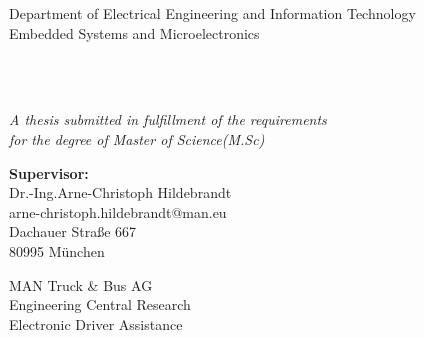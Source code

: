 \begin{titlepage}
\begin{center}
\begin{figure}
\centering
{}
\qquad
{}
\end{figure}

{\Large Department of Electrical Engineering and Information Technology}\\[1.5cm]
{\large Embedded Systems and Microelectronics}\\[0.5cm]

\HRule \\[0.4cm]
{ \huge \ttitle \par}\vspace{0.4cm}
\HRule \\[0.4cm]
\end{center}

\begin{center}
{\textit{A thesis submitted in fulfillment of the requirements\\ for the degree of Master of Science(M.Sc)}}\\[1cm]



\begin{minipage}{0.5\textwidth}
\begin{flushleft}
\textbf{Supervisor:}\\[0.1cm]
Dr.-Ing.Arne-Christoph Hildebrandt\\
arne-christoph.hildebrandt@man.eu\\
Dachauer Straße 667\\
80995 München\\[0.2cm]
\end{flushleft}
\end{minipage}
\begin{minipage}{0.49\textwidth}
\begin{flushright} 
MAN Truck \& Bus AG \\
Engineering Central Research \\
Electronic Driver Assistance \\
\end{flushright}
\end{minipage}
\vspace{1cm}



\end{center}
\end{titlepage}
